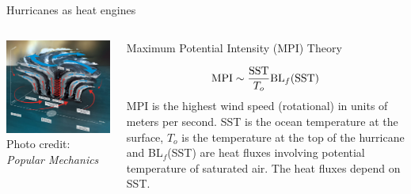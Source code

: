 \documentclass[handout]{beamer}
\begin{document}
\begin{frame}{Hurricanes as heat engines}
\begin{columns}
\begin{column}{5cm}
\includegraphics[scale=.2]{figures/heatEngine.jpg}\\
{\footnotesize Photo credit: {\it Popular Mechanics}}
\end{column}
\begin{column}{6cm}
\begin{center}
\alert{Maximum Potential Intensity (MPI) Theory}
\end{center}
$$
\hbox{MPI} \sim \frac{\hbox{SST}}{T_o}\hbox{BL}_{f}(\hbox{SST})
$$
MPI is the highest wind speed (rotational) in units of meters per second. SST is the ocean temperature at the surface, $T_o$ is the temperature at the top of the hurricane and BL$_{f}$(SST) are heat fluxes involving potential temperature of saturated air. The heat fluxes depend on SST.
\end{column}
\end{columns}
\end{frame}
\end{document}
